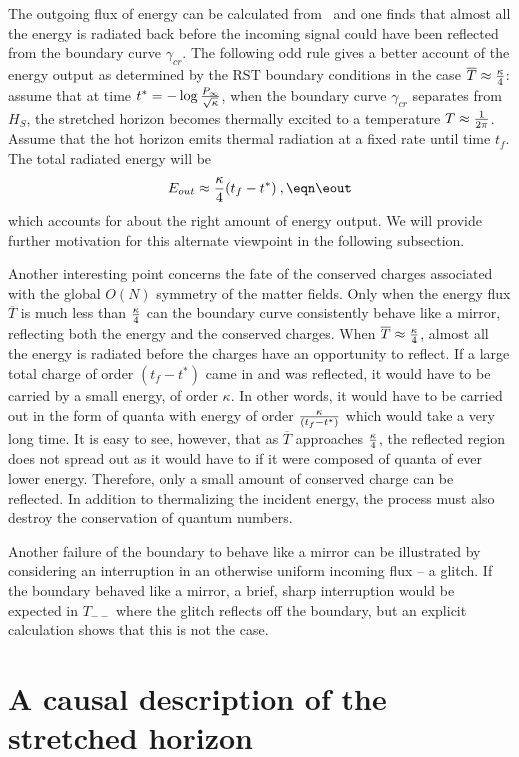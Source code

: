 The outgoing flux of energy can be calculated from \ and one
finds that almost all the energy is radiated back before the incoming
signal could have been reflected from the boundary curve
$\gamma_{cr}$.  The following odd rule gives a better account of the
energy output as determined by the RST boundary conditions in the
case ${\overline T} \approx {\kappa\over 4}$: assume that at time
$t^* = -\log{P_\infty\over \sqrt{\kappa}}$, when the boundary curve
$\gamma_{cr}$ separates from $H_S$, the stretched horizon becomes
thermally excited to a temperature $T\approx {1\over 2\pi}$.  Assume
that the hot horizon emits thermal radiation at a fixed rate until
time $t_f$.  The total radiated energy will be
$$
E_{out}\approx {\kappa \over 4}(t_f-t^*) \>,
\eqn\eout
$$
which accounts for about the right amount of energy output.  We will
provide further motivation for this alternate viewpoint in the
following subsection.

Another interesting point concerns the fate of the conserved charges
associated with the global $O(N)$ symmetry of the matter fields.
Only when the energy flux ${\overline T}$ is much less than ${\kappa
\over 4}$ can the boundary curve consistently behave like a mirror,
reflecting both the energy and the conserved charges.  When
${\overline T} \approx {\kappa \over 4}$, almost all the energy is
radiated before the charges have an opportunity to reflect.  If a
large total charge of order $(t_f{-}t^*)$ came in and was reflected,
it would have to be carried by a small energy, of order $\kappa$.  In
other words, it would have to be carried out in the form of quanta
with energy of order ${\kappa\over (t_f{-}t^*)}$ which would take a
very long time.  It is easy to see, however, that as ${\overline T}$
approaches ${\kappa \over 4}$, the reflected region does not spread
out as it would have to if it were composed of quanta of ever lower
energy.  Therefore, only a small amount of conserved charge can be
reflected.  In addition to thermalizing the incident energy, the
process must also destroy the conservation of quantum numbers.

Another failure of the boundary to behave like a mirror can be
illustrated by considering an interruption in an otherwise uniform
incoming flux -- a glitch.  If the boundary behaved like a mirror, a
brief, sharp interruption would be expected in $T_{--}$ where the
glitch reflects off the boundary, but an explicit calculation shows
that this is not the case.


\section{A causal description of the stretched horizon}


